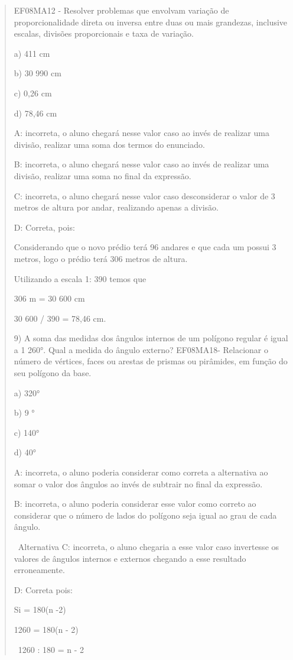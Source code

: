 \begin{quote}
\begin{escolha}
EF08MA12 - Resolver problemas que envolvam variação de proporcionalidade
direta ou inversa entre duas ou mais grandezas, inclusive escalas,
divisões proporcionais e taxa de variação.

a) 411 cm

b) 30 990 cm

c) 0,26 cm

d) 78,46 cm

A: incorreta, o aluno chegará nesse valor caso ao invés de realizar uma
divisão, realizar uma soma dos termos do enunciado.

B: incorreta, o aluno chegará nesse valor caso ao invés de realizar uma
divisão, realizar uma soma no final da expressão.

C: incorreta, o aluno chegará nesse valor caso desconsiderar o valor de
3 metros de altura por andar, realizando apenas a divisão.

D: Correta, pois:

Considerando que o novo prédio terá 96 andares e que cada um possui 3
metros, logo o prédio terá 306 metros de altura.

Utilizando a escala 1: 390 temos que

306 m = 30 600 cm

30 600 / 390 = 78,46 cm.

9) A soma das medidas dos ângulos internos de um polígono regular é
igual a 1 260°. Qual a medida do ângulo externo? EF08MA18- Relacionar o
número de vértices, faces ou arestas de prismas ou pirâmides, em função
do seu polígono da base.

a) 320°

b) 9 °

c) 140°

d) 40°

A: incorreta, o aluno poderia considerar como correta a alternativa ao
somar o valor dos ângulos ao invés de subtrair no final da expressão.

B: incorreta, o aluno poderia considerar esse valor como correto ao
considerar que o número de lados do polígono seja igual ao grau de cada
ângulo.

~Alternativa C: incorreta, o aluno chegaria a esse valor caso invertesse
os valores de ângulos internos e externos chegando a esse resultado
erroneamente.

D: Correta pois:

Si = 180(n -2)

1260 = 180(n - 2)

~1260 : 180 = n - 2


\end{escolha}
\end{quote}

